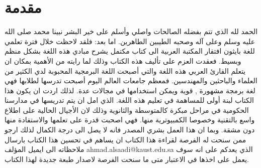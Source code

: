 \chapter*{مقدمة}
الحمد لله الذي تتم بفضله الصالحات واصلي وأسلم على خير البشر نبينا محمد صلى الله عليه وسلم وعلى آله وصحبه الطيبين الطاهرين. اما بعد:
فلقد لاحظت خلال فترة تعلمي للغة بايثون افتقار المكتبة العربية الى كتاب مكتمل يشرح مبادي هذه اللغة بشكل منظم وبسيط. فعقدت العزم على تأليف هذه الكتاب وذلك لما رايته من الأهمية بمكان ان يتعلم القارئ العربي هذه اللغة والتي أصبحت اللغة البرمجية المحبوبة لدي الكثير من العلماء والباحثين والمهندسين. فمعظم جامعات العالم اليوم أصبحت تدرسها لطلابها فهي لغة برمجة مشهورة , قوية ويمكن استخدامها في مجالات عدة. لذلك اردت ان يكون هذا الكتاب لبنة أولى للمساهمة في تعليم هذه اللغة. الذي امل ان يتم تدريسها في مدارسنا الحكومية في مراحل مبكرة كالمتوسطة والثانوية وذلك لان الأجيال الحالية على اطلاع واسع بالتقنية وخصوصا الكمبيوترية منها. فهي اصحبت قدرة على تعلمها والاستفادة منها دون مشقة. وبما ان هذا العمل بشري المصدر فانه لا يصل الى درجة الكمال لذلك ارجو ممن سنحت له الفرصة لقراءة هذا الكتاب ان يساهم في تحسين هذا الكتاب بارسال ملاحظاته الى ايميل المؤلف 
ahmad.alsaadi@kaust.edu.sa
 الذي يعدكم على انه سوف يعمل على اخذها في الاعتبار متى ما سنحت الفرصة لاصدار طبعة جديدة لهذا الكتاب.